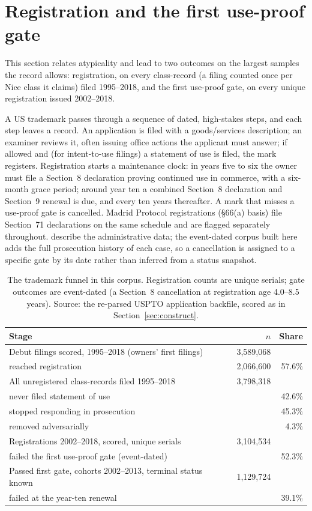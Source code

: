 \section{Registration and the first use-proof gate}\label{sec:life}

This section relates atypicality and lead to two outcomes on the largest
samples the record allows: registration, on every class-record (a filing
counted once per Nice class it claims) filed 1995--2018, and the first
use-proof gate, on every unique registration issued 2002--2018.

A US trademark passes through a sequence of dated, high-stakes steps, and
each step leaves a record. An application is filed with a goods/services
description; an examiner reviews it, often issuing office actions the
applicant must answer; if allowed and (for intent-to-use filings) a
statement of use is filed, the mark registers. Registration starts a
maintenance clock: in years five to six the owner must file a Section~8
declaration proving continued use in commerce, with a six-month grace
period; around year ten a combined Section~8 declaration and Section~9
renewal is due, and every ten years thereafter. A mark that misses a
use-proof gate is cancelled. Madrid Protocol registrations
(\S66(a) basis) file Section~71 declarations on the same schedule and
are flagged separately throughout. \citet{Graham2013} describe the
administrative data; the event-dated corpus built here adds the full
prosecution history of each case, so a cancellation is assigned to a
specific gate by its date rather than inferred from a status snapshot.

\begin{table}[h]\centering\small
\caption{The trademark funnel in this corpus. Registration counts are
unique serials; gate outcomes are event-dated (a Section~8 cancellation
at registration age 4.0--8.5 years). Source: the re-parsed USPTO
application backfile, scored as in Section~\ref{sec:construct}.}
\label{tab:funnel}
\begin{tabular}{lrr}
\toprule
Stage & $n$ & Share \\
\midrule
Debut filings scored, 1995--2018 (owners' first filings) & 3{,}589{,}068 & \\
\quad reached registration & 2{,}066{,}600 & 57.6\% \\
\midrule
All unregistered class-records filed 1995--2018 & 3{,}798{,}318 & \\
\quad never filed statement of use & & 42.6\% \\
\quad stopped responding in prosecution & & 45.3\% \\
\quad removed adversarially & & 4.3\% \\
\midrule
Registrations 2002--2018, scored, unique serials & 3{,}104{,}534 & \\
\quad failed the first use-proof gate (event-dated) & & 52.3\% \\
\midrule
Passed first gate, cohorts 2002--2013, terminal status known & 1{,}129{,}724 & \\
\quad failed at the year-ten renewal & & 39.1\% \\
\bottomrule
\end{tabular}
\end{table}

